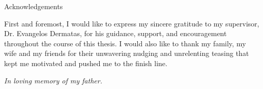 \begin{center}
{\LARGE Acknowledgements}\\[1cm]
\end{center}

First and foremost, I would like to express my sincere gratitude to my supervisor, Dr. Evangelos Dermatas, for his guidance, support, and encouragement throughout the course of this thesis. I would also like to thank my family, my wife and my friends for their unwavering nudging and unrelenting teasing that kept me motivated and pushed me to the finish line.

\vspace*{\fill}
\begin{flushright}
\textit{In loving memory of my father.}
\end{flushright}